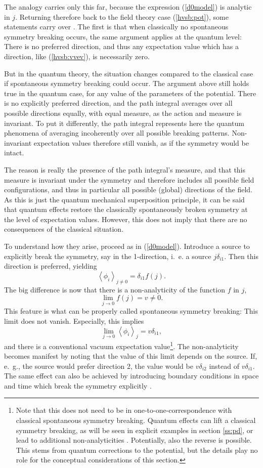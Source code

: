 \documentclass[final,12pt]{article}
\newcommand*{\no}{\noindent}
\newcommand*{\be}{\begin{equation}}
\newcommand*{\ee}{\end{equation}}
\newcommand*{\pref}[1]{(\ref{#1})}
\newcommand*{\1}{1\!\!\!\bot}
\newcommand*{\la}{\left\langle}
\newcommand*{\ra}{\right\rangle}
\begin{document}
The analogy carries only this far, because the expression \pref{d0model} is analytic in $j$. Returning therefore back to the field theory case \pref{hvsb:pot}, some statements carry over \cite{Perez:2008fv}. The first is that when classically no spontaneous symmetry breaking occurs, the same argument applies at the quantum level: There is no preferred direction, and thus any expectation value which has a direction, like \pref{hvsb:vvev}, is necessarily zero.

But in the quantum theory, the situation changes compared to the classical case if spontaneous symmetry breaking could occur. The argument above still holds true in the quantum case, for any value of the parameters of the potential. There is no explicitly preferred direction, and the path integral averages over all possible directions equally, with equal measure, as the action and measure is invariant. To put it differently, the path integral represents here the quantum phenomena of averaging incoherently over all possible breaking patterns. Non-invariant expectation values therefore still vanish, as if the symmetry would be intact.

The reason is really the presence of the path integral's measure, and that this measure is invariant under the symmetry and therefore includes all possible field configurations, and thus in particular all possible (global) directions of the field. As this is just the quantum mechanical superposition principle, it can be said that quantum effects restore the classically spontaneously broken symmetry at the level of expectation values. However, this does not imply that there are no consequences of the classical situation.

To understand how they arise, proceed as in \pref{d0model}. Introduce a source to explicitly break the symmetry, say in the 1-direction, i.\ e. a source $j\delta_{i1}$. Then this direction is preferred, yielding
\be
\la\phi_i\ra_{j\neq 0}=\delta_{i1}f(j)\label{vev}.
\ee
\no The big difference is now that there is a non-analyticity of the function $f$ in $j$,
\be
\lim_{j\to 0}f(j)=v\neq 0\label{vevlimit}.
\ee
\no This feature is what can be properly called spontaneous symmetry breaking: This limit does not vanish. Especially, this implies
\be
\lim_{j\to 0}\la\phi_i\ra_{j}=v\delta_{i1}\label{limssb},
\ee
\no and there is a conventional vacuum expectation value\footnote{Note that this does not need to be in one-to-one-correspondence with classical spontaneous symmetry breaking. Quantum effects can lift a classical symmetry breaking, as will be seen in explicit examples in section \ref{ss:pd}, or lead to additional non-analyticities \cite{Maas:2013sca}. Potentially, also the reverse is possible. This stems from quantum corrections to the potential, but the details play no role for the conceptual considerations of this section.}. The non-analyticity becomes manifest by noting that the value of this limit depends on the source. If, e.\ g., the source would prefer direction 2, the value would be $v\delta_{i2}$ instead of $v\delta_{i1}$. The same effect can also be achieved by introducing boundary conditions in space and time which break the symmetry explicitly \cite{Strocchi:2005yk,Frohlich:1976it}.
\end{document}
